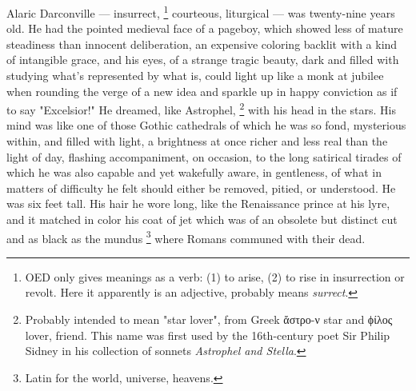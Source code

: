   Alaric Darconville --- insurrect, 
\footnote{\textdbend OED only gives meanings as a verb: (1) to arise, (2) to
rise in insurrection or revolt. Here it apparently is an adjective, probably means 
\textit{surrect}.}
courteous, liturgical
--- was twenty-nine years old.
He had the pointed medieval face of a pageboy, 
which showed less of mature
steadiness than innocent deliberation, an expensive coloring backlit with a kind
of intangible grace, and his eyes, of a strange tragic beauty, dark and filled
with studying what's represented by what is, could light up like a monk at
jubilee 
when rounding the verge of a new idea and sparkle up in happy conviction
as if to say "Excelsior!" 
He dreamed, like Astrophel, 
\footnote{Probably intended to mean "star lover", from Greek ἄστρο-ν star 
and ϕίλος lover, friend. This name was first used by the 16th-century poet 
Sir Philip Sidney in his collection of sonnets \textit{Astrophel and Stella}.
}
with his head in the stars. His mind was like one of those Gothic 
cathedrals of which he was so fond,
mysterious within, and filled with light, a brightness at once richer and less
real than the light of day, flashing accompaniment, on occasion, to the long
satirical tirades 
of which he was also capable and yet wakefully aware, in
gentleness, of what in matters of difficulty he felt should either be removed,
pitied, or understood. He was six feet tall. His hair he wore long, like the
Renaissance prince at his lyre, and it matched in color his coat of jet which
was of an obsolete but distinct cut and as black as the mundus 
\footnote{Latin for the world, universe, heavens.}
where Romans communed 
with their dead.

